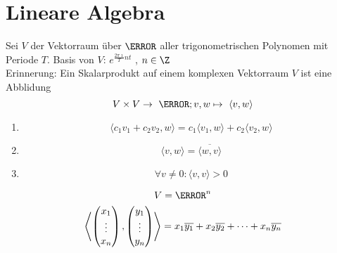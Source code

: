 \section{Lineare Algebra}
Sei $V$ der Vektorraum über $\C$ aller trigonometrischen Polynomen mit Periode $T$. Basis von $V$: $e^{\frac{2\pi\imath}{T} nt}$ , $n \in \Z$ \\
Erinnerung: Ein Skalarprodukt auf einem komplexen Vektorraum $V$ ist eine Abblidung
\[ V \times V \rightarrow \C ; v , w \mapsto \langle v , w \rangle \]
\begin{enumerate}[label=\arabic*)]
	\item \[ \langle c_1 v_1 + c_2 v_2 , w \rangle = c_1 \langle v_1 , w \rangle + c_2 \langle v_2 , w \rangle \]
	\item \[ \langle v , w \rangle = \overline{\langle w , v \rangle} \]
	\item \[ \forall v \neq 0 : \langle v , v \rangle > 0 \]
\end{enumerate}
\begin{bsp*}
	\begin{gather*}
		V = \C^n \\
		\left\langle \begin{pmatrix} x_1 \\ \vdots \\ x_n \end{pmatrix} , \begin{pmatrix} y_1 \\ \vdots \\ y_n \end{pmatrix} \right\rangle =  x_1 \overline{y_1} + x_2 \overline{y_2} + \dots + x_n \overline{y_n}
	\end{gather*}
\end{bsp*}

